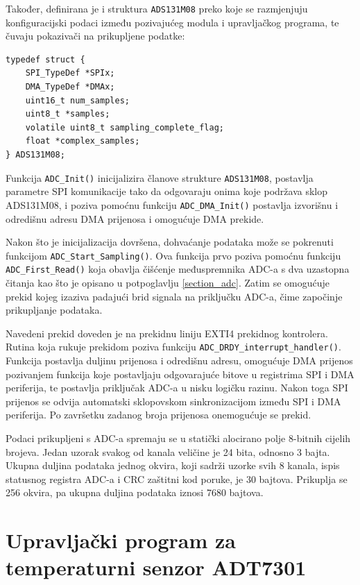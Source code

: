 Također, definirana je i struktura \texttt{ADS131M08} preko koje se razmjenjuju konfiguracijski podaci između pozivajućeg modula i upravljačkog programa, te čuvaju pokazivači na prikupljene podatke:

\begin{lstlisting}[caption={Definicija tipa \texttt{ADS131M08}}]
typedef struct {
    SPI_TypeDef *SPIx;
    DMA_TypeDef *DMAx;
    uint16_t num_samples;
    uint8_t *samples;
    volatile uint8_t sampling_complete_flag;
    float *complex_samples;
} ADS131M08;
\end{lstlisting}

Funkcija \texttt{ADC\_Init()} inicijalizira članove strukture \texttt{ADS131M08}, postavlja parametre SPI komunikacije tako da odgovaraju onima koje podržava sklop ADS131M08, i poziva pomoćnu funkciju \texttt{ADC\_DMA\_Init()} postavlja izvorišnu i odredišnu adresu DMA prijenosa i omogućuje DMA prekide.

Nakon što je inicijalizacija dovršena, dohvaćanje podataka može se pokrenuti funkcijom \texttt{ADC\_Start\_Sampling()}. Ova funkcija prvo poziva pomoćnu funkciju \texttt{ADC\_First\_Read()} koja obavlja čišćenje međuspremnika ADC-a s dva uzastopna čitanja kao što je opisano u potpoglavlju \ref{section_adc}. Zatim se omogućuje prekid kojeg izaziva padajući brid signala na priključku  ADC-a, čime započinje prikupljanje podataka.

Navedeni prekid doveden je na prekidnu liniju EXTI4 prekidnog kontrolera. Rutina koja rukuje prekidom poziva funkciju \texttt{ADC\_DRDY\_interrupt\_handler()}. Funkcija postavlja duljinu prijenosa i odredišnu adresu, omogućuje DMA prijenos pozivanjem funkcija koje postavljaju odgovarajuće bitove u registrima SPI i DMA periferija, te postavlja priključak  ADC-a u nisku logičku razinu. Nakon toga SPI prijenos se odvija automatski sklopovskom sinkronizacijom između SPI i DMA periferija. Po završetku zadanog broja prijenosa onemogućuje se  prekid.

Podaci prikupljeni s ADC-a spremaju se u statički alocirano polje 8-bitnih cijelih brojeva. Jedan uzorak svakog od kanala veličine je 24 bita, odnosno 3 bajta. Ukupna duljina podataka jednog okvira, koji sadrži uzorke svih 8 kanala, ispis statusnog registra ADC-a i CRC zaštitni kod poruke, je 30 bajtova. Prikuplja se 256 okvira, pa ukupna duljina podataka iznosi 7680 bajtova.

\section{Upravljački program za temperaturni senzor ADT7301}

